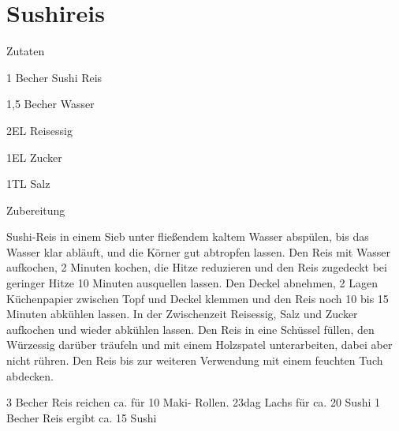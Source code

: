 \chapter*{Sushireis}
\begin{multicols}{2}
 {\Large Zutaten}
 \begin{Zutaten}
		\item 1 Becher Sushi Reis
		\item 1,5 Becher Wasser
		\item 2EL Reisessig
		\item 1EL Zucker
		\item 1TL Salz
		
		
		
\end{Zutaten}
\columnbreak
{}
\end{multicols}

{\Large Zubereitung} \newline
\begin{addmargin}[1cm]{0cm}
	Sushi-Reis in einem Sieb unter fließendem kaltem Wasser abspülen, bis das Wasser klar abläuft, und
	die Körner gut abtropfen lassen.\newline
	Den Reis mit Wasser aufkochen, 2 Minuten kochen, die Hitze reduzieren und den Reis
	zugedeckt bei geringer Hitze 10 Minuten ausquellen lassen.\newline
	Den Deckel abnehmen, 2 Lagen Küchenpapier zwischen Topf und Deckel klemmen und den Reis noch 10 bis
	15 Minuten abkühlen lassen.\newline
	In der Zwischenzeit Reisessig, Salz und Zucker aufkochen und wieder abkühlen lassen.\newline
	Den Reis in eine Schüssel füllen, den Würzessig darüber träufeln und mit einem Holzspatel
	unterarbeiten, dabei aber nicht rühren.\newline
	Den Reis bis zur weiteren Verwendung mit einem feuchten Tuch abdecken.\newline\newline
	
	3 Becher Reis reichen ca. für 10 Maki- Rollen.
	23dag Lachs für ca. 20 Sushi
	1 Becher Reis ergibt ca. 15 Sushi
	
	
	
\end{addmargin}

